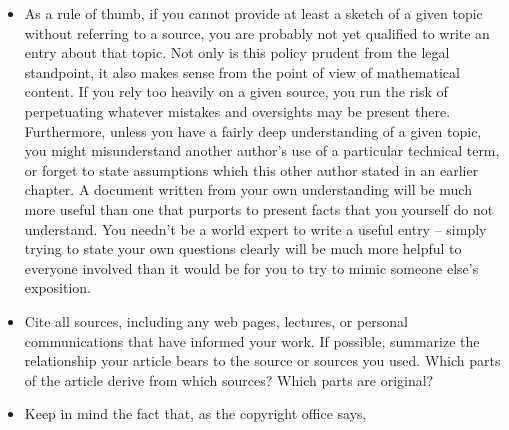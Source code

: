 \begin{itemize}
government. As a rule of thumb, works published in the ninteteenth
century and earlier are in the public domain, but unless you can
find proof to the contrary, twentieth century works are likely to be
off-limits. It is of course wise to give a citation so that others
can easily check the assignment (or expiry) of copyright for
themselves -- and perhaps also find additional useful material from
the same source.
\footnote{When dealing with older works, keep the following points in
mind: (a) The law on when copyright expires is somewhat different
for unpublished works, so these need to be treated as a special
case; (b) Before World War II, English was not the dominant language
of the mathematical community. Therefore, older works are more
likely than contemporary works to appear in a language other than
English. Since translation is a creative act, translations are
protected by copyright, even if the work that was translated is in
the public domain. Thus, if you quote at length from an older work
written in a foreign language, you should either do the translation
yourself, or else find a translation which is also in the public
domain (or FDL'ed).}
\item As a rule of thumb, if you cannot provide at least a sketch of a
given topic without referring to a source, you are probably not yet
qualified to write an entry about that topic. Not only is this
policy prudent from the legal standpoint, it also makes sense from the
point of view of mathematical content. If you rely too heavily on a
given source, you run the risk of perpetuating whatever mistakes and
oversights may be present there. Furthermore, unless you have a
fairly deep understanding of a given topic, you might misunderstand
another author's use of a particular technical term, or forget to
state assumptions which this other author stated in an earlier
chapter. A document written from your own understanding will be much
more useful than one that purports to present facts that you
yourself do not understand. You needn't be a world expert to write
a useful entry -- simply trying to state your own questions clearly
will be much more helpful to everyone involved than it would be for
you to try to mimic someone else's exposition.
\item Cite all sources, including any web pages, lectures, or personal
communications that have informed your work. If possible, summarize
the relationship your article bears to the source or sources you
used. Which parts of the article derive from which sources? Which
parts are original?
\item Keep in mind the fact that, as the copyright office says,

\end{itemize}
